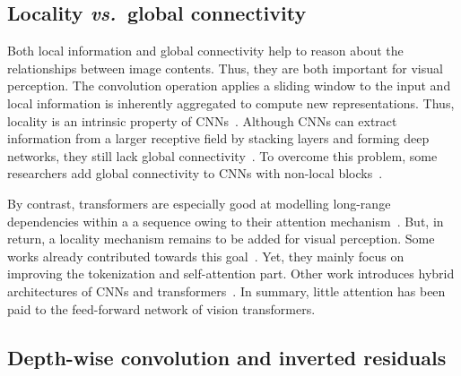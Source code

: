 \documentclass[10pt,twocolumn,letterpaper]{article}
\def\vs{\emph{vs.\ }}
\begin{document}
\subsection{Locality \vs global connectivity}

Both local information and global connectivity help to reason about the relationships between  image contents. Thus, they are both important for visual perception.
The convolution operation applies a sliding window to the input and local information is inherently aggregated to compute new representations. Thus, locality is an intrinsic property of CNNs~\cite{lecun1995convolutional}. 
Although CNNs can extract information from a larger receptive field by stacking layers and forming deep networks, they still lack global connectivity~\cite{krizhevsky2012imagenet,simonyan2014very,he2016deep}. To overcome this problem, some researchers add global connectivity to CNNs with non-local blocks~\cite{wang2018non,liu2018non}. 

By contrast, transformers are especially good at modelling long-range dependencies within a a sequence owing to their attention mechanism~\cite{vaswani2017attention,devlin2018bert,choromanski2020rethinking,kitaev2020reformer}. But, in return, a locality mechanism remains to be added for visual perception. Some works already contributed towards this goal~\cite{yuan2021tokens,liu2021swin}. Yet, they mainly focus on improving the tokenization and self-attention part. Other work introduces hybrid architectures of CNNs and transformers~\cite{carion2020end,srinivas2021bottleneck,li2021bossnas}. In summary, little attention has been paid to the feed-forward network of vision transformers. 


\subsection{Depth-wise convolution and inverted residuals}
\end{document}
